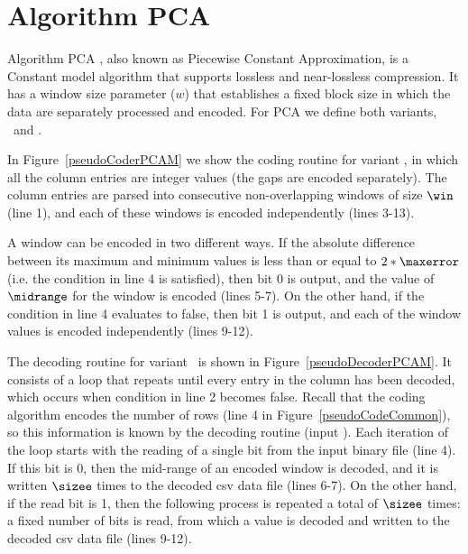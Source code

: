 
\vspace{-15pt}
\section{Algorithm PCA}
\label{algo:pca}


\vspace{-5pt}
Algorithm PCA \cite{coder:pca}, also known as Piecewise Constant Approximation, is a Constant model algorithm that supports lossless and near-lossless compression. It has a window size parameter ($w$) that establishes a fixed block size in which the data are separately processed and encoded. For PCA we define both variants, \maskalgo\ and \NOmaskalgo.


In Figure~\ref{pseudoCoderPCAM} we show the coding routine for variant \maskalgo, in which all the column entries are integer values (the gaps are encoded separately). The column entries are parsed into consecutive non-overlapping windows of size $\win$ (line 1), and each of these windows is encoded independently (lines 3-13). 





A window can be encoded in two different ways. If the absolute difference between its maximum and minimum values is less than or equal to $2*\maxerror$ (i.e. the condition in line 4 is satisfied), then bit 0 is output, and the value of $\midrange$ for the window is encoded (lines 5-7). On the other hand, if the condition in line 4 evaluates to false, then bit 1 is output, and each of the window values is encoded independently (lines 9-12).  


The decoding routine for variant \maskalgo\ is shown in Figure~\ref{pseudoDecoderPCAM}. It consists of a loop that repeats until every entry in the column has been decoded, which occurs when condition in line 2 becomes false. Recall that the coding algorithm encodes the number of rows (line 4 in Figure~\ref{pseudoCodeCommon}), so this information is known by the decoding routine (input \colSize). Each iteration of the loop starts with the reading of a single bit from the input binary file (line 4). If this bit is 0, then the mid-range of an encoded window is decoded, and it is written $\sizee$ times to the decoded csv data file (lines 6-7). On the other hand, if the read bit is 1, then the following process is repeated a total of $\sizee$ times: a fixed number of bits is read, from which a value is decoded and written to the decoded csv data file (lines 9-12).


